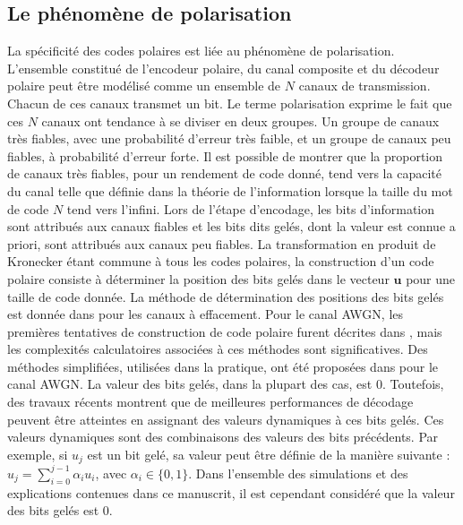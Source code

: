 \subsection{Le phénomène de polarisation}
\label{subsec:polarisation}
La spécificité des codes polaires est liée au phénomène de polarisation. L'ensemble constitué de l'encodeur polaire, du canal composite et du décodeur polaire peut être modélisé comme un ensemble de $N$ canaux de transmission. Chacun de ces canaux transmet un bit. Le terme \og polarisation \fg exprime le fait que ces $N$ canaux ont tendance à se diviser en deux groupes. Un groupe de canaux très fiables, avec une probabilité d'erreur très faible, et un groupe de canaux peu fiables, à probabilité d'erreur forte.
Il est possible de montrer que la proportion de canaux très fiables, pour un rendement de code donné, tend vers la capacité du canal telle que définie dans la théorie de l'information \cite{shannon_mathematical_2001} lorsque la taille du mot de code $N$ tend vers l'infini.
Lors de l'étape d'encodage, les bits d'information sont attribués aux canaux fiables et les bits dits gelés, dont la valeur est connue a priori, sont attribués aux canaux peu fiables. La transformation en produit de Kronecker étant commune à tous les codes polaires, la construction d'un code polaire consiste à déterminer la position des bits gelés dans le vecteur $\mathbold{u}$ pour une taille de code donnée. La méthode de détermination des positions des bits gelés est donnée dans \cite{arikan_channel_2009} pour les canaux à effacement. Pour le canal AWGN, les premières tentatives de construction de code polaire furent décrites dans \cite{mori_performance_2009,mori_properties_2010}, mais les complexités calculatoires associées à ces méthodes sont significatives. Des méthodes simplifiées, utilisées dans la pratique, ont été proposées dans \cite{tal_how_2013,trifonov_efficient_2012,trifonov_randomized_2018} pour le canal AWGN. La valeur des bits gelés, dans la plupart des cas, est 0. Toutefois, des travaux récents \cite{trifonov_polar_2016,trifonov_randomized_2017} montrent que de meilleures performances de décodage peuvent être atteintes en assignant des valeurs dynamiques à ces bits gelés. Ces valeurs dynamiques sont des combinaisons des valeurs des bits précédents. Par exemple, si $u_j$ est un bit gelé, sa valeur peut être définie de la manière suivante : $u_j=\sum^{j-1}_{i=0} \alpha_i u_i$, avec $\alpha_i \in \{0,1\}$. Dans l'ensemble des simulations et des explications contenues dans ce manuscrit, il est cependant considéré que la valeur des bits gelés est 0.

